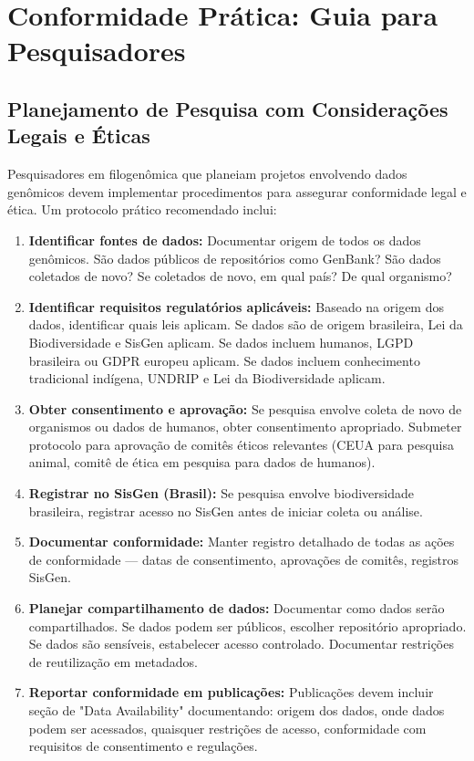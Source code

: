 \section{Conformidade Prática: Guia para Pesquisadores}

\subsection{Planejamento de Pesquisa com Considerações Legais e Éticas}

Pesquisadores em filogenômica que planeiam projetos envolvendo dados genômicos devem implementar procedimentos para assegurar conformidade legal e ética. Um protocolo prático recomendado inclui:

\begin{enumerate}
    \item \textbf{Identificar fontes de dados:} Documentar origem de todos os dados genômicos. São dados públicos de repositórios como GenBank? São dados coletados de novo? Se coletados de novo, em qual país? De qual organismo?

    \item \textbf{Identificar requisitos regulatórios aplicáveis:} Baseado na origem dos dados, identificar quais leis aplicam. Se dados são de origem brasileira, Lei da Biodiversidade e SisGen aplicam. Se dados incluem humanos, LGPD brasileira ou GDPR europeu aplicam. Se dados incluem conhecimento tradicional indígena, UNDRIP e Lei da Biodiversidade aplicam.

    \item \textbf{Obter consentimento e aprovação:} Se pesquisa envolve coleta de novo de organismos ou dados de humanos, obter consentimento apropriado. Submeter protocolo para aprovação de comitês éticos relevantes (CEUA para pesquisa animal, comitê de ética em pesquisa para dados de humanos).

    \item \textbf{Registrar no SisGen (Brasil):} Se pesquisa envolve biodiversidade brasileira, registrar acesso no SisGen antes de iniciar coleta ou análise.

    \item \textbf{Documentar conformidade:} Manter registro detalhado de todas as ações de conformidade --- datas de consentimento, aprovações de comitês, registros SisGen.

    \item \textbf{Planejar compartilhamento de dados:} Documentar como dados serão compartilhados. Se dados podem ser públicos, escolher repositório apropriado. Se dados são sensíveis, estabelecer acesso controlado. Documentar restrições de reutilização em metadados.

    \item \textbf{Reportar conformidade em publicações:} Publicações devem incluir seção de "Data Availability" documentando: origem dos dados, onde dados podem ser acessados, quaisquer restrições de acesso, conformidade com requisitos de consentimento e regulações.
\end{enumerate}

